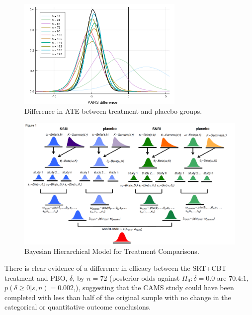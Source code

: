 \documentclass{juliacon}
\begin{document}
\begin{figure}[t]
	\centerline{\includegraphics[width=8cm]{pars_difference_sequential.png}}
	\caption{Difference in ATE between treatment and placebo groups.} 
	\label{fig:pars_diff}
\end{figure}

\begin{figure}[t]
	\centerline{\includegraphics[width=18cm]{bhm_model.png}}
	\caption{Bayesian Hierarchical Model for Treatment Comparisons.}
	\label{fig:bhm}
\end{figure}
\vskip 6pt
There is clear evidence of a difference in efficacy between the SRT+CBT treatment and PBO, $\delta$, by $n=72$ (posterior odds against $H_0:\delta=0.0$ are $70.4$:$1$, $p(\delta \ge 0|s,n) = 0.002$,), suggesting that the CAMS study could have been completed with less than half of the original sample with no change in the categorical or quantitative outcome conclusions.
\end{document}
